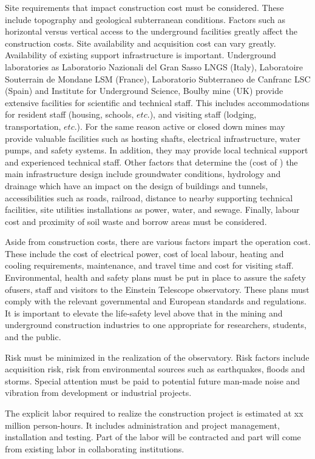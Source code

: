 Site requirements that impact construction cost must be considered. These include topography and geological subterranean conditions. Factors such as horizontal versus vertical access to the underground facilities greatly affect the construction costs. Site availability and acquisition cost can vary greatly. Availability of existing support infrastructure is important. Underground laboratories as Laboratorio Nazionali del Gran Sasso LNGS (Italy), Laboratoire Souterrain de Mondane LSM (France), Laboratorio Subterraneo de Canfranc LSC (Spain) and Institute for Underground Science, Boulby mine (UK) provide extensive facilities for scientific and technical staff. This includes accommodations for resident staff (housing, schools, $etc.$), and visiting staff (lodging, transportation, $etc$.). For the same reason active or closed down mines may provide valuable facilities such as hosting shafts, electrical infrastructure, water pumps, and safety systems. In addition, they may provide local technical support and experienced technical staff. Other factors that determine the (cost of ) the main infrastructure design include groundwater conditions, hydrology and drainage which have an impact on the design of buildings and tunnels, accessibilities such as roads, railroad, distance to nearby supporting technical facilities, site utilities installations as power, water, and sewage. Finally, labour cost and proximity of soil waste and borrow areas must be considered. 

Aside from construction costs, there are various factors impart the operation cost. These include the cost of electrical power, cost of local labour, heating and cooling requirements, maintenance, and travel time and cost for visiting staff. Environmental, health and safety plans must be put in place to assure the safety ofusers, staff and visitors to the Einstein Telescope observatory. These plans must comply with the relevant governmental and European standards and regulations. It is important to elevate the life-safety level above that in the mining and underground construction industries to one appropriate for researchers, students, and the public. 

Risk must be minimized in the realization of the observatory. Risk factors include acquisition risk, risk from environmental sources such as earthquakes, floods and storms. Special attention must be paid to potential future man-made noise and vibration from development or industrial projects. 

The explicit labor required to realize the construction project is estimated at xx million person-hours. It includes administration and project management, installation and testing. Part of the labor will be contracted and part will come from existing labor in collaborating institutions.
%
%
